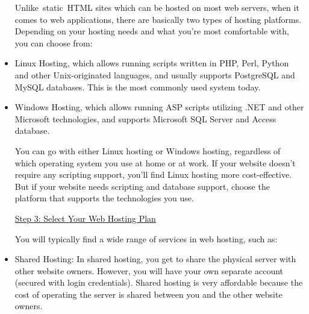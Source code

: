\documentclass[12pt]{report}
\renewcommand{\_}{\kern-1.5pt\textunderscore\kern-1.5pt}
\begin{document}
\begin{itemize}
\textcolor[HTML]{0D0D0D}{Unlike\ static\ HTML sites which can be hosted on most web servers, when it   comes to web applications, there are basically two types of hosting platforms. Depending on your hosting needs and what you’re most comfortable with, you can choose from:}\par

	\item {\fontsize{13pt}{15.6pt}\selectfont \textcolor[HTML]{0D0D0D}{Linux Hosting, which allows running scripts written in PHP, Perl, Python and other Unix-originated languages, and usually supports PostgreSQL and MySQL databases. This is the most commonly used system today.}\par}\par

	\item {\fontsize{13pt}{15.6pt}\selectfont \textcolor[HTML]{0D0D0D}{Windows Hosting, which allows running ASP scripts utilizing .NET and other Microsoft technologies, and supports Microsoft SQL Server and Access database.}\par}\par

\textcolor[HTML]{0D0D0D}{You can go with either Linux hosting or Windows hosting, regardless of which operating system you use at home or at work. If your website doesn’t require any scripting support, you’ll find Linux hosting more cost-eﬀective. But if your website needs scripting and database support, choose the platform that supports the technologies you use.}\par


\vspace{\baselineskip}\textcolor[HTML]{0D0D0D}{\uline{Step 3: Select Your Web Hosting Plan}}\par

\textcolor[HTML]{0D0D0D}{You will typically find a wide range of services in web hosting, such as:}\par

	\item {\fontsize{13pt}{15.6pt}\selectfont \textcolor[HTML]{0D0D0D}{Shared Hosting: In shared hosting, you get to share the physical server with other website owners. However, you will have your own separate account (secured with login credentials). Shared hosting is very aﬀordable because the cost of operating the server is shared between you and the other website owners.}\par}\par


\end{itemize}
\end{document}

